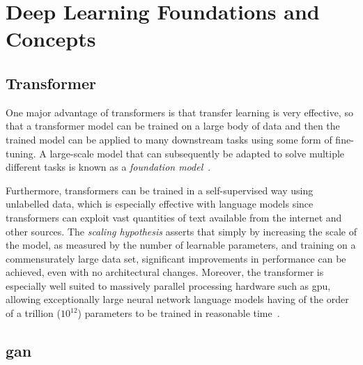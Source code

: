 \chapter{Deep Learning Foundations and Concepts}\label{chp:deep_learning_foundations_concepts}
\minitoc

\section{Transformer}

One major advantage of transformers is that transfer learning is very effective, so that a transformer model can be trained on a large body of data and then the trained model can be applied to many downstream tasks using some form of fine-tuning.
A large-scale model that can subsequently be adapted to solve multiple different tasks is known as a \emph{foundation model}~\cite{Bishop2023Nov}.

Furthermore, transformers can be trained in a self-supervised way using unlabelled data, which is especially effective with language models since transformers can exploit vast quantities of text available from the internet and other sources.
The \emph{scaling hypothesis} asserts that simply by increasing the scale of the model, as measured by the number of learnable parameters, and training on a commensurately large data set, significant improvements in performance can be achieved, even with no architectural changes.
Moreover, the transformer is especially well suited to massively parallel processing hardware such as \gls{gpu}, allowing exceptionally large neural network language models having of the order of a trillion (\( 10^{12} \)) parameters to be trained in reasonable time~\cite{Bishop2023Nov}.

\section{\gls{gan}}



